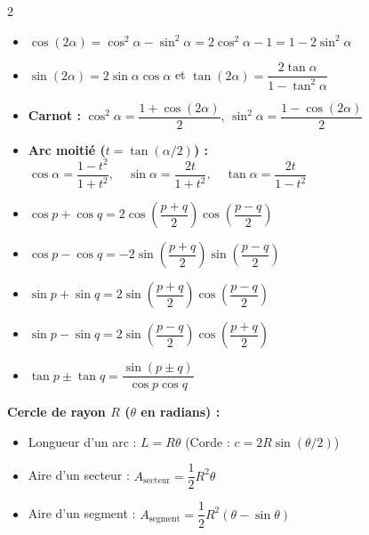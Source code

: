 {\begin{multicols}{2}
\vspace{3pt}
\begin{itemize}[leftmargin=1.2em, itemsep=1.5pt, topsep=2pt]
    \item $\cos(2\alpha) = \cos^2\alpha - \sin^2\alpha = 2\cos^2\alpha - 1 = 1 - 2\sin^2\alpha$
    \item $\sin(2\alpha) = 2\sin\alpha\cos\alpha$ \quad et \quad $\tan(2\alpha) = \dfrac{2\tan\alpha}{1 - \tan^2\alpha}$
    \item \textbf{Carnot :} $\cos^2\alpha = \dfrac{1+\cos(2\alpha)}{2}$, \quad $\sin^2\alpha = \dfrac{1-\cos(2\alpha)}{2}$
    \item \textbf{Arc moitié ($t = \tan(\alpha/2)$) :}\\
    $\cos\alpha = \dfrac{1-t^2}{1+t^2}, \quad \sin\alpha = \dfrac{2t}{1+t^2}, \quad \tan\alpha = \dfrac{2t}{1-t^2}$
\end{itemize}

\vspace{3pt}
\begin{itemize}[leftmargin=1.2em, itemsep=2pt, topsep=2pt]
    \item $\cos p + \cos q = 2\cos\left(\dfrac{p+q}{2}\right)\cos\left(\dfrac{p-q}{2}\right)$
    \item $\cos p - \cos q = -2\sin\left(\dfrac{p+q}{2}\right)\sin\left(\dfrac{p-q}{2}\right)$
    \item $\sin p + \sin q = 2\sin\left(\dfrac{p+q}{2}\right)\cos\left(\dfrac{p-q}{2}\right)$
    \item $\sin p - \sin q = 2\sin\left(\dfrac{p-q}{2}\right)\cos\left(\dfrac{p+q}{2}\right)$
    \item $\tan p \pm \tan q = \dfrac{\sin(p \pm q)}{\cos p \cos q}$
\end{itemize}

\columnbreak


\vspace{2pt}
\noindent\textbf{Cercle de rayon $R$ ($\theta$ en radians) :}
\begin{itemize}[leftmargin=1.2em, itemsep=1.5pt, topsep=2pt]
    \item Longueur d'un arc : $L = R\theta$ \quad (Corde : $c = 2R\sin(\theta/2)$)
    \item Aire d'un secteur : $A_{\text{secteur}} = \dfrac{1}{2}R^2\theta$
    \item Aire d'un segment : $A_{\text{segment}} = \dfrac{1}{2}R^2(\theta - \sin\theta)$
\end{itemize}


\end{multicols}}
